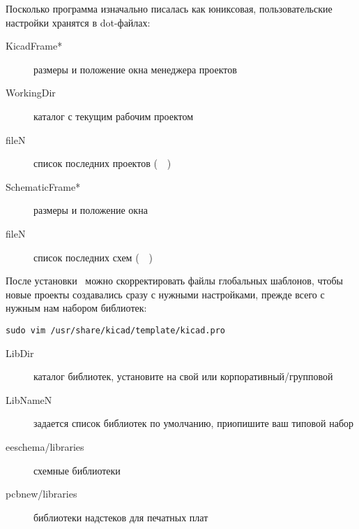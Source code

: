 
Посколько программа изначально писалась как юниксовая, пользовательские
настройки хранятся в dot-файлах:


\begin{description}
\item[KicadFrame*] размеры и положение окна менеджера проектов
\item[WorkingDir] каталог с текущим рабочим проектом
\item[fileN] список последних проектов (\ \ )
\end{description}


\begin{description}
\item[SchematicFrame*] размеры и положение окна 
\item[fileN] список последних схем (\ \ )
\end{description}

\label{kicadtemplates}

После установки \kicad\ можно скорректировать файлы глобальных шаблонов, чтобы
новые проекты создавались сразу с нужными настройками, прежде всего с нужным
нам набором библиотек:

\begin{verbatim}
sudo vim /usr/share/kicad/template/kicad.pro
\end{verbatim}


\begin{description}
\item[LibDir] каталог библиотек, установите на свой или корпоративный/групповой
\item[LibNameN] задается список библиотек по умолчанию, приопишите ваш типовой
набор
\item[eeschema/libraries] схемные библиотеки \eeschema
\item[pcbnew/libraries] библиотеки надстеков для печатных плат \pcbnew
\end{description}

\secup
